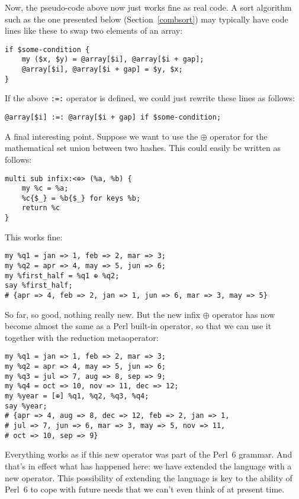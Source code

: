 Now, the pseudo-code above now just works fine as real code. 
A sort algorithm such as the one presented below 
(Section~\ref{combsort}) may typically have code lines 
like these to swap two elements of an array:

\begin{verbatim}
if $some-condition {
    my ($x, $y) = @array[$i], @array[$i + gap];
    @array[$i], @array[$i + gap] = $y, $x;
}
\end{verbatim}

If the above  \verb':=:' operator is defined, we 
could just rewrite these lines as follows:

\begin{verbatim}
@array[$i] :=: @array[$i + gap] if $some-condition;
\end{verbatim}

A final interesting point. Suppose we want to use 
the $\oplus$ operator for the mathematical set 
union between two hashes. This could easily be 
written as follows:

\begin{verbatim}
multi sub infix:<⊕> (%a, %b) {
    my %c = %a;
    %c{$_} = %b{$_} for keys %b;
    return %c
}
\end{verbatim}

This works fine:

\begin{verbatim}
my %q1 = jan => 1, feb => 2, mar => 3;
my %q2 = apr => 4, may => 5, jun => 6;
my %first_half = %q1 ⊕ %q2;
say %first_half;
# {apr => 4, feb => 2, jan => 1, jun => 6, mar => 3, may => 5}
\end{verbatim}

So far, so good, nothing really new. But the new 
infix $\oplus$ operator has now become almost the same 
as a Perl built-in operator, so that we can use it 
together with the reduction metaoperator:

\begin{verbatim}
my %q1 = jan => 1, feb => 2, mar => 3;
my %q2 = apr => 4, may => 5, jun => 6;
my %q3 = jul => 7, aug => 8, sep => 9;
my %q4 = oct => 10, nov => 11, dec => 12;
my %year = [⊕] %q1, %q2, %q3, %q4;
say %year;
# {apr => 4, aug => 8, dec => 12, feb => 2, jan => 1, 
# jul => 7, jun => 6, mar => 3, may => 5, nov => 11, 
# oct => 10, sep => 9}
\end{verbatim}

Everything works as if this new operator was part 
of the Perl~6 grammar. And that's in effect what 
has happened here: we have extended the 
language with a new operator. This possibility of 
extending the language is key to the ability of  
Perl~6 to cope with future needs that we can't even 
think of at present time.

